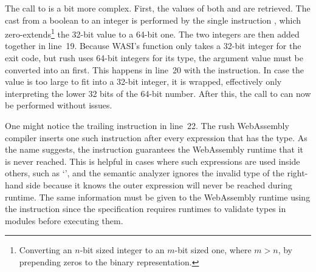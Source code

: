 The call to  is a bit more complex.
First, the values of both  and  are retrieved.
The cast from a boolean to an integer is performed by the single instruction , which zero-extends\footnote{Converting an $n$-bit sized integer to an $m$-bit sized one, where $m>n$, by prepending zeros to the binary representation.} the 32-bit value to a 64-bit one.
The two integers are then added together in line~19.
Because WASI's  function only takes a 32-bit integer for the exit code, but rush uses 64-bit integers for its  type, the argument value must be converted into an  first.
This happens in line~20 with the  instruction.
In case the value is too large to fit into a 32-bit integer, it is wrapped, effectively only interpreting the lower 32 bits of the 64-bit number.
After this, the call to  can now be performed without issues.

One might notice the trailing  instruction in line~22.
The rush WebAssembly compiler inserts one such instruction after every expression that has the \qVerb{!} type.
As the name suggests, the instruction guarantees the WebAssembly runtime that it is never reached.
This is helpful in cases where such expressions are used inside others, such as `', and the semantic analyzer ignores the invalid type of the right-hand side because it knows the outer expression will never be reached during runtime.
The same information must be given to the WebAssembly runtime using the  instruction since the specification requires runtimes to validate types in modules before executing them.
